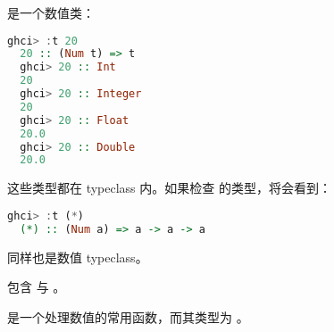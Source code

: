 \documentclass[./main.tex]{subfiles}
\begin{document}
 是一个数值类：

\begin{lstlisting}[language=Haskell]
  ghci> :t 20
  20 :: (Num t) => t
  ghci> 20 :: Int
  20
  ghci> 20 :: Integer
  20
  ghci> 20 :: Float
  20.0
  ghci> 20 :: Double
  20.0
\end{lstlisting}

这些类型都在  typeclass 内。如果检查 \acode{*} 的类型，将会看到：

\begin{lstlisting}[language=Haskell]
  ghci> :t (*)
  (*) :: (Num a) => a -> a -> a
\end{lstlisting}

 同样也是数值 typeclass。

 包含  与 。

 是一个处理数值的常用函数，而其类型为 。
\end{document}

